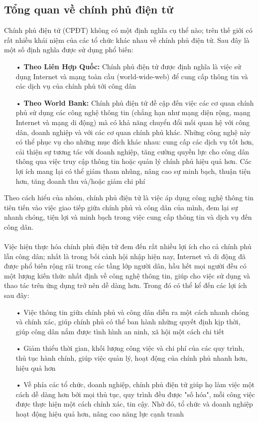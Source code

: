 \documentclass[a4paper]{article}
\begin{document}
\subsection{Tổng quan về chính phủ điện tử}
Chính phủ điện tử (CPĐT) không có một định nghĩa cụ thể nào; trên thế giới có rất nhiều khái niệm của các tổ chức khác nhau về chính phủ điện tử. Sau đây là một số định nghĩa được sử dụng phổ biến:
\begin{itemize}
	\item[•]\textbf{Theo Liên Hợp Quốc: }Chính phủ điện tử được định nghĩa là việc sử dụng Internet và mạng toàn cầu (world-wide-web) để cung cấp thông tin và các dịch vụ của chính phủ tới công dân \cite{bib1}
	\item[•]\textbf{Theo World Bank: }Chính phủ điện tử đề cập đến việc các cơ quan chính phủ sử dụng các công nghệ thông tin (chẳng hạn như mạng diện rộng, mạng Internet và mạng di động) mà có khả năng chuyển đổi mối quan hệ với công dân, doanh nghiệp và với các cơ quan chính phủ khác. Những công nghệ này có thể phục vụ cho những mục đích khác nhau: cung cấp các dịch vụ tốt hơn, cải thiện sự tương tác với doanh nghiệp, tăng cường quyền lực cho công dân thông qua việc truy cập thông tin hoặc quản lý chính phủ hiệu quả hơn. Các lợi ích mang lại có thể giảm tham nhũng, nâng cao sự minh bạch, thuận tiện hơn, tăng doanh thu và/hoặc giảm chi phí \cite{bib2}
\end{itemize}
Theo cách hiểu của nhóm, chính phủ điện tử là việc áp dụng công nghệ thông tin tiên tiến vào việc giao tiếp giữa chính phủ và công dân của mình, đem lại sự nhanh chóng, tiện lợi và minh bạch trong việc cung cấp thông tin và dịch vụ đến công dân.\\
\\
Việc hiện thực hóa chính phủ điện tử đem đến rất nhiều lợi ích cho cả chính phủ lẫn công dân; nhất là trong bối cảnh hội nhập hiện nay, Internet và di động đã được phổ biến rộng rãi trong các tầng lớp người dân, hầu hết mọi người đều có một lượng kiến thức nhất định về công nghệ thông tin, giúp cho việc sử dụng và thao tác trên ứng dụng trở nên dễ dàng hơn. Trong đó có thể kể đến các lợi ích sau đây:
\begin{itemize}
	\item[•]Việc thông tin giữa chính phủ và công dân diễn ra một cách nhanh chóng và chính xác, giúp chính phủ có thể ban hành những quyết định kịp thời, giúp công dân nắm được tình hình an ninh, xã hội một cách chi tiết
	\item[•]Giảm thiểu thời gian, khối lượng công việc và chi phí của các quy trình, thủ tục hành chính, giúp việc quản lý, hoạt động của chính phủ nhanh hơn, hiệu quả hơn
	\item[•]Về phía các tổ chức, doanh nghiệp, chính phủ điện tử giúp họ làm việc một cách dễ dàng hơn bởi mọi thủ tục, quy trình đều được "số hóa", mỗi công việc được thực hiện một cách chính xác, tin cậy. Nhờ đó, tổ chức và doanh nghiệp hoạt động hiệu quả hơn, nâng cao năng lực cạnh tranh
\end{itemize}
\end{document}
